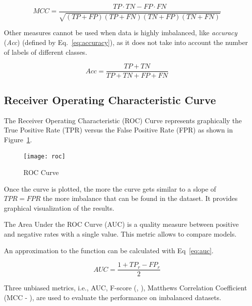\begin{equation}\label{eq:mcc}
    MCC = \frac{TP \cdot TN - FP \cdot FN}{\sqrt{(TP + FP)(TP + FN)(TN + FP)(TN + FN)}}
\end{equation}

Other measures cannot be used when data is highly imbalanced, like 
\textit{accuracy} (\textit{Acc}) (defined by Eq.~\ref{eq:accuracy}), as it does 
not take into account the number of labels of different classes.

\begin{equation}\label{eq:accuracy}
    Acc = \frac{TP + TN}{TP + TN + FP + FN}
\end{equation}

\subsection{Receiver Operating Characteristic Curve}\label{sec:roc}

The Receiver Operating Characteristic (ROC)\cite{Fawcett2006} Curve represents 
graphically the True Positive Rate (TPR) versus the False Positive Rate (FPR) 
as shown in Figure~\ref{fig:roc}.

\begin{figure}
\centering
\texttt{[image: roc]} %
\caption{ROC Curve}
\label{fig:roc}
\end{figure}

Once the curve is plotted, the more the curve gets similar to a slope of
$TPR = FPR$ the more imbalance that can be found in the dataset. It provides
graphical visualization of the results. 

The Area Under the ROC Curve (AUC) is a quality measure between positive and 
negative rates with a single value. This metric allows to compare models.

An approximation to the function can be calculated with Eq~\ref{eq:auc}.

\begin{equation}\label{eq:auc}
    AUC = \frac{1 + TP_{r} - FP_{r}}{2}
\end{equation}

Three unbiased metrics, i.e., AUC, F-score (\cite{sorensen1948}, 
\cite{dice1945}), Matthews Correlation Coefficient (MCC - \cite{Matthews1975}), 
are used to evaluate the performance on imbalanced datasets.

